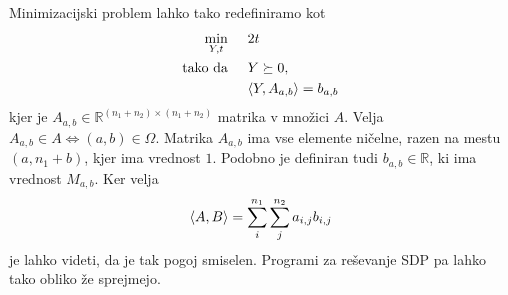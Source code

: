 Minimizacijski problem lahko tako redefiniramo kot 
\begin{align*}
    \min_{Y,t} \hspace{0.5cm} &2t\\
    \text{tako da} \hspace{0.5cm} & Y \succeq 0,\\
    &\langle Y, A_{a,b} \rangle = b_{a,b}
\end{align*} 
kjer je $A_{a,b} \in \mathbb{R}^{(n_1 + n_2) \times (n_1 + n_2)}$ matrika v množici $A$. Velja 
$A_{a, b} \in A \iff (a, b) \in \Omega$. Matrika $A_{a,b}$ ima vse elemente ničelne, razen na mestu $(a, n_1 + b)$, kjer ima vrednost $1$.
Podobno je definiran tudi $b_{a,b} \in \mathbb{R}$, ki ima vrednost $M_{a, b}$.
Ker velja 
\[
    \langle A, B \rangle = \sum_{i}^{n_1} \sum_{j}^{n_2} a_{i,j}b_{i,j}
\] je lahko videti, da je tak pogoj smiselen. Programi za reševanje SDP pa lahko tako obliko že sprejmejo.
\cite{Survey-NKS19}



